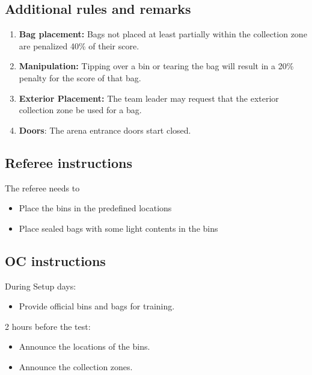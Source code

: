 \subsection{Additional rules and remarks}
\begin{enumerate}[nosep]
	\item \textbf{Bag placement:} Bags not placed at least partially within the collection zone are penalized 40\% of their score.
	\item \textbf{Manipulation:}  Tipping over a bin or tearing the bag will result in a 20\% penalty for the score of that bag.
	\item \textbf{Exterior Placement:} The team leader may request that the exterior collection zone be used for a bag.
	\item \textbf{Doors}: The arena entrance doors start closed.

\end{enumerate}

\subsection{Referee instructions}

The referee needs to
\begin{itemize}
	\item Place the bins in the predefined locations
	\item Place sealed bags with some light contents in the bins
\end{itemize}

\subsection{OC instructions}
During Setup days:
\begin{itemize}
	\item Provide official bins and bags for training.
\end{itemize}

2 hours before the test:
\begin{itemize}
	\item Announce the locations of the bins.
	\item Announce the collection zones.
\end{itemize}

% 


